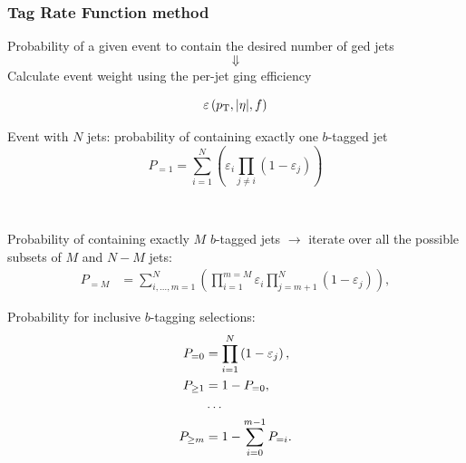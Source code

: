 \begin{frame}\frametitle{Tag Rate Function method}
\centering\scriptsize

\begin{minipage}{.45\textwidth}\centering

Probability of a given event to contain the desired number of \btag ged jets
$$\Downarrow$$
Calculate event weight using the
per-jet  \btag ging efficiency

$$\varepsilon \left(\pt,|\eta|,f\right)$$

Event with $N$ jets: probability of 
containing exactly one $b$-tagged jet
$$P_{=1} = \sum\limits_{i=1}^N \left( \varepsilon_{i} \prod\limits_{j \neq i} \left( 1 - \varepsilon_{j} \right) \right)$$
\end{minipage}\begin{minipage}{.05\textwidth}\centering
$\,$
\end{minipage}\begin{minipage}{.5\textwidth}\centering

Probability of containing exactly $M$ $b$-tagged jets $\to$ iterate over all the possible subsets of $M$ and $N-M$ jets:
\begin{align*}
        P_{=M} &= \sum\limits_{i,\dots,m=1}^N 
        \left( 
        \prod\limits_{i=1}^{m=M} \varepsilon_{i}  
        \prod\limits_{j=m+1}^N \left( 1 - \varepsilon_{j} \right) 
        \right),
\end{align*}

Probability for inclusive $b$-tagging selections:
\begin{align*}
	P_{=0} &= \prod\limits_{i=1}^N \left( 1 - \varepsilon_{j} \right), \\
	P_{\geq 1} &= 1 - P_{=0},\\
&\dots \notag\\
	P_{\geq m} &= 1 - \sum\limits_{i=0}^{m-1} P_{=i}.
\end{align*}
\end{minipage}

\end{frame}



